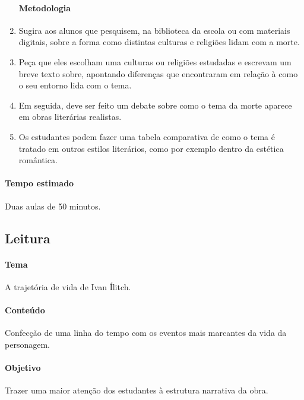\documentclass[12pt]{extarticle}
\begin{document}
\begin{enumerate}
\paragraph{Metodologia} 

\item Sugira aos alunos que pesquisem, na biblioteca da escola ou
com materiais digitais, sobre a forma como distintas culturas e religiões
lidam com a morte.

\item Peça que eles escolham uma culturas ou religiões estudadas e
escrevam um breve texto sobre, apontando diferenças que encontraram
em relação à como o seu entorno lida com o tema.

\item Em seguida, deve ser feito um debate sobre como o tema da morte aparece
em obras literárias realistas.

\item Os estudantes podem fazer uma tabela comparativa de como o tema
é tratado em outros estilos literários, como por exemplo dentro da estética romântica.

\end{enumerate}

\paragraph{Tempo estimado} Duas aulas de 50 minutos.


\subsection{Leitura}



\paragraph{Tema} A trajetória de vida de Ivan Ílitch.

\paragraph{Conteúdo} Confecção de uma linha do tempo com os eventos mais
marcantes da vida da personagem.

\paragraph{Objetivo} Trazer uma maior atenção dos estudantes à estrutura
narrativa da obra.
\end{document}
